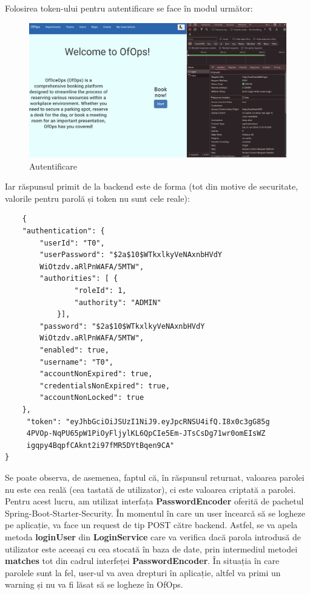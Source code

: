 Folosirea token-ului pentru autentificare se face în modul următor:

\begin{figure}[!htb]
    \centering
    \includegraphics[width=0.9\linewidth]{images/autentificare.png}
    \caption{Autentificare}
    \label{fig:autentificare}
\end{figure}

Iar răspunsul primit de la backend este de forma (tot din motive de securitate, valorile pentru parolă și token nu sunt cele reale):

\begin{center}
\begin{minipage}{0.8\textwidth}
\captionsetup{type=listing}
   \begin{lstlisting}
    {
    "authentication": {
        "userId": "T0",
        "userPassword": "$2a$10$WTkxlkyVeNAxnbHVdY
        WiOtzdv.aRlPnWAFA/5MTW",
        "authorities": [ {
                "roleId": 1,
                "authority": "ADMIN"
            }],
        "password": "$2a$10$WTkxlkyVeNAxnbHVdY
        WiOtzdv.aRlPnWAFA/5MTW",
        "enabled": true,
        "username": "T0",
        "accountNonExpired": true,
        "credentialsNonExpired": true,
        "accountNonLocked": true
    },
     "token": "eyJhbGciOiJSUzI1NiJ9.eyJpcRNSU4ifQ.I8x0c3gG85g
     4PVOp-NqPU65pW1PiOyFljylKL6QpCIe5Em-JTsCsDg71wr0omEIsWZ
     igqpy4BqpfCAknt2i97fMR5DYtBqen9CA"
}
\end{lstlisting} 
\end{minipage}
\end{center}

Se poate observa, de asemenea, faptul că, în răspunsul returnat, valoarea parolei nu este cea reală (cea tastată de utilizator), ci este valoarea criptată a parolei. Pentru acest lucru, am utilizat interfața \textbf{PasswordEncoder} oferită de pachetul Spring-Boot-Starter-Security. În momentul în care un user încearcă să se logheze pe aplicație, va face un request de tip POST către backend. Astfel, se va apela metoda \textbf{loginUser} din \textbf{LoginService} care va verifica dacă parola introdusă de utilizator este aceeași cu cea stocată în baza de date, prin intermediul metodei \textbf{matches} tot din cadrul interfeței \textbf{PasswordEncoder}. În situația în care parolele sunt la fel, user-ul va avea drepturi în aplicație, altfel va primi un warning și nu va fi lăsat să se logheze în OfOps.

